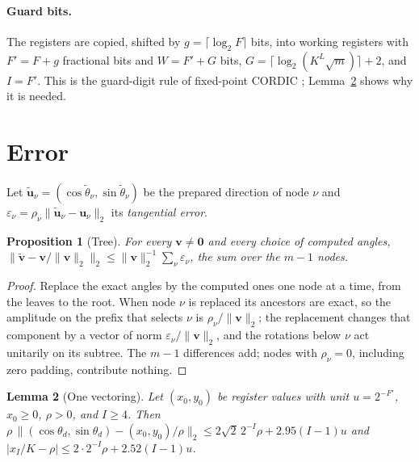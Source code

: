 \documentclass[9pt,twocolumn]{extarticle}
\newcommand{\norm}[1]{\lVert #1\rVert}
\newtheorem{proposition}{Proposition}
\newtheorem{lemma}[proposition]{Lemma}
\begin{document}
\paragraph{Guard bits.} The registers are copied, shifted by $g = \lceil\log_2
F\rceil$ bits, into working registers with $F' = F + g$ fractional bits and
$W = F' + G$ bits, $G = \lceil \log_2 (K^L\sqrt m)\rceil + 2$, and $I = F'$.
This is the guard-digit rule of fixed-point CORDIC \cite{hu1992quantization};
Lemma~\ref{lem:pair} shows why it is needed.

\section{Error}\label{sec:error}

Let $\tilde{\bm u}_\nu = (\cos\tilde\theta_\nu, \sin\tilde\theta_\nu)$ be the
prepared direction of node $\nu$ and
$\varepsilon_\nu = \rho_\nu\norm{\tilde{\bm u}_\nu - \bm u_\nu}_2$ its
\emph{tangential error}.

\begin{proposition}[Tree]\label{prop:tree}
For every $\bm v \ne \bm 0$ and every choice of computed angles,
$\norm{\tilde{\bm v} - \bm v/\norm{\bm v}_2}_2 \le
\norm{\bm v}_2^{-1}\sum_\nu \varepsilon_\nu$, the sum over the $m - 1$ nodes.
\end{proposition}

\begin{proof}
Replace the exact angles by the computed ones one node at a time, from the
leaves to the root. When node $\nu$ is replaced its ancestors are exact, so the
amplitude on the prefix that selects $\nu$ is $\rho_\nu/\norm{\bm v}_2$; the
replacement changes that component by a vector of norm
$\varepsilon_\nu/\norm{\bm v}_2$, and the rotations below $\nu$ act unitarily
on its subtree. The $m - 1$ differences add; nodes with $\rho_\nu = 0$,
including zero padding, contribute nothing.
\end{proof}

\begin{lemma}[One vectoring]\label{lem:pair}
Let $(x_0, y_0)$ be register values with unit $u = 2^{-F'}$, $x_0 \ge 0$,
$\rho > 0$, and $I \ge 4$. Then
$\rho\,\norm{(\cos\theta_d, \sin\theta_d) - (x_0, y_0)/\rho}_2
\le 2\sqrt2\,2^{-I}\rho + 2.95(I - 1)u$ and
$|x_I/K - \rho| \le 2\cdot 2^{-I}\rho + 2.52(I - 1)u$.
\end{lemma}
\end{document}
